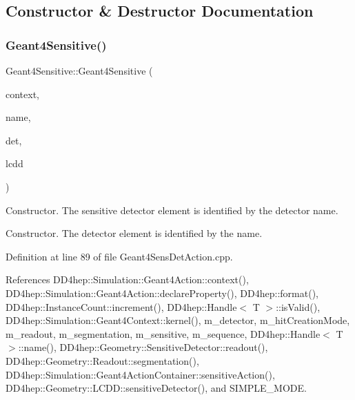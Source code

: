 \subsection{Constructor \& Destructor Documentation}
\hypertarget{class_d_d4hep_1_1_simulation_1_1_geant4_sensitive_a262aa19cea5ad71e75ff8250a55572f5}{}\label{class_d_d4hep_1_1_simulation_1_1_geant4_sensitive_a262aa19cea5ad71e75ff8250a55572f5} 
\subsubsection{\texorpdfstring{Geant4\+Sensitive()}{Geant4Sensitive()}}
{\footnotesize\ttfamily Geant4\+Sensitive\+::\+Geant4\+Sensitive (\begin{DoxyParamCaption}\item[{\hyperlink{class_d_d4hep_1_1_simulation_1_1_geant4_context}{Geant4\+Context} $\ast$}]{context,  }\item[{const std\+::string \&}]{name,  }\item[{\hyperlink{class_d_d4hep_1_1_simulation_1_1_geant4_sensitive_a1cb1af5fb1194be1e1c1137f1e54272b}{Det\+Element}}]{det,  }\item[{\hyperlink{class_d_d4hep_1_1_simulation_1_1_geant4_sensitive_a3373caa6917867ca7c871df20fb467c8}{L\+C\+DD} \&}]{lcdd }\end{DoxyParamCaption})}



Constructor. The sensitive detector element is identified by the detector name. 

Constructor. The detector element is identified by the name. 

Definition at line 89 of file Geant4\+Sens\+Det\+Action.\+cpp.



References D\+D4hep\+::\+Simulation\+::\+Geant4\+Action\+::context(), D\+D4hep\+::\+Simulation\+::\+Geant4\+Action\+::declare\+Property(), D\+D4hep\+::format(), D\+D4hep\+::\+Instance\+Count\+::increment(), D\+D4hep\+::\+Handle$<$ T $>$\+::is\+Valid(), D\+D4hep\+::\+Simulation\+::\+Geant4\+Context\+::kernel(), m\+\_\+detector, m\+\_\+hit\+Creation\+Mode, m\+\_\+readout, m\+\_\+segmentation, m\+\_\+sensitive, m\+\_\+sequence, D\+D4hep\+::\+Handle$<$ T $>$\+::name(), D\+D4hep\+::\+Geometry\+::\+Sensitive\+Detector\+::readout(), D\+D4hep\+::\+Geometry\+::\+Readout\+::segmentation(), D\+D4hep\+::\+Simulation\+::\+Geant4\+Action\+Container\+::sensitive\+Action(), D\+D4hep\+::\+Geometry\+::\+L\+C\+D\+D\+::sensitive\+Detector(), and S\+I\+M\+P\+L\+E\+\_\+\+M\+O\+DE.

